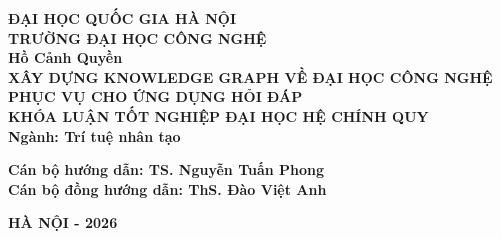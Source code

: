 \thispagestyle{empty}
\usetikzlibrary{calc}

\begin{center}

\fontsize{12pt}{1pt}\selectfont
\textbf{ĐẠI HỌC QUỐC GIA HÀ NỘI}\\
\textbf{TRƯỜNG ĐẠI HỌC CÔNG NGHỆ}\\[1.5cm]


\fontsize{14pt}{6pt}\selectfont
\textbf{Hồ Cảnh Quyền} \\[2cm]

\fontsize{16pt}{6pt}\selectfont
\textbf{XÂY DỰNG KNOWLEDGE GRAPH VỀ ĐẠI HỌC CÔNG NGHỆ PHỤC VỤ CHO ỨNG DỤNG HỎI ĐÁP
}\\ [3 cm]



\fontsize{14pt}{6pt}\selectfont
\textbf{KHÓA LUẬN TỐT NGHIỆP ĐẠI HỌC HỆ CHÍNH QUY} \\[0.2 cm]
\textbf{Ngành: Trí tuệ nhân tạo}\\[3cm]

\begin{flushleft}
\fontsize{14pt}{6pt}\selectfont
\textbf{Cán bộ hướng dẫn: TS. Nguyễn Tuấn Phong}\\[0.2 cm]
\textbf{Cán bộ đồng hướng dẫn: ThS. Đào Việt Anh}\\[6.6 cm]
\end{flushleft}

\fontsize{12pt}{6pt}\selectfont
\textbf{HÀ NỘI - 2026} 
\end{center}
